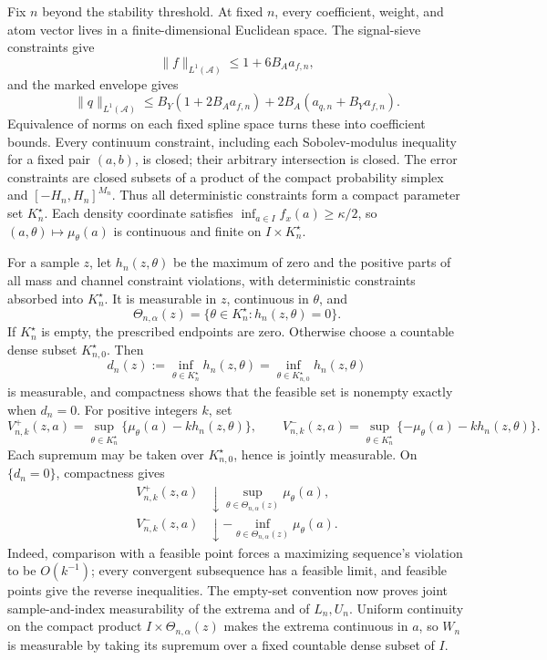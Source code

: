 Fix \(n\) beyond the stability threshold. At fixed \(n\), every coefficient, weight, and atom vector lives in a finite-dimensional Euclidean space. The signal-sieve constraints give
\[
 \|f\|_{L^1(\mathcal A)}\le1+6B_Aa_{f,n},
\]
and the marked envelope gives
\[
 \|q\|_{L^1(\mathcal A)}
 \le B_Y(1+2B_Aa_{f,n})+2B_A(a_{q,n}+B_Ya_{f,n}).
\]
Equivalence of norms on each fixed spline space turns these into coefficient bounds. Every continuum constraint, including each Sobolev-modulus inequality for a fixed pair \((a,b)\), is closed; their arbitrary intersection is closed. The error constraints are closed subsets of a product of the compact probability simplex and \([-H_n,H_n]^{M_n}\). Thus all deterministic constraints form a compact parameter set \(K_n^\star\). Each density coordinate satisfies \(\inf_{a\in I}f_x(a)\ge\kappa/2\), so \((a,\theta)\mapsto\mu_\theta(a)\) is continuous and finite on \(I\times K_n^\star\).

For a sample \(z\), let \(h_n(z,\theta)\) be the maximum of zero and the positive parts of all mass and channel constraint violations, with deterministic constraints absorbed into \(K_n^\star\). It is measurable in \(z\), continuous in \(\theta\), and
\[
 \Theta_{n,\alpha}(z)=\{\theta\in K_n^\star:h_n(z,\theta)=0\}.
\]
If \(K_n^\star\) is empty, the prescribed endpoints are zero. Otherwise choose a countable dense subset \(K_{n,0}^\star\). Then
\[
 d_n(z):=\inf_{\theta\in K_n^\star}h_n(z,\theta)
 =\inf_{\theta\in K_{n,0}^\star}h_n(z,\theta)
\]
is measurable, and compactness shows that the feasible set is nonempty exactly when \(d_n=0\). For positive integers \(k\), set
\[
 V_{n,k}^+(z,a)=\sup_{\theta\in K_n^\star}
 \{\mu_\theta(a)-kh_n(z,\theta)\},
 \qquad
 V_{n,k}^-(z,a)=\sup_{\theta\in K_n^\star}
 \{-\mu_\theta(a)-kh_n(z,\theta)\}.
\]
Each supremum may be taken over \(K_{n,0}^\star\), hence is jointly measurable. On \(\{d_n=0\}\), compactness gives
\[
 \begin{aligned}
 V_{n,k}^+(z,a)&\downarrow
 \sup_{\theta\in\Theta_{n,\alpha}(z)}\mu_\theta(a),\\
 V_{n,k}^-(z,a)&\downarrow
 -\inf_{\theta\in\Theta_{n,\alpha}(z)}\mu_\theta(a).
 \end{aligned}
\]
Indeed, comparison with a feasible point forces a maximizing sequence's violation to be \(O(k^{-1})\); every convergent subsequence has a feasible limit, and feasible points give the reverse inequalities. The empty-set convention now proves joint sample-and-index measurability of the extrema and of \(L_n,U_n\). Uniform continuity on the compact product \(I\times\Theta_{n,\alpha}(z)\) makes the extrema continuous in \(a\), so \(W_n\) is measurable by taking its supremum over a fixed countable dense subset of \(I\).

